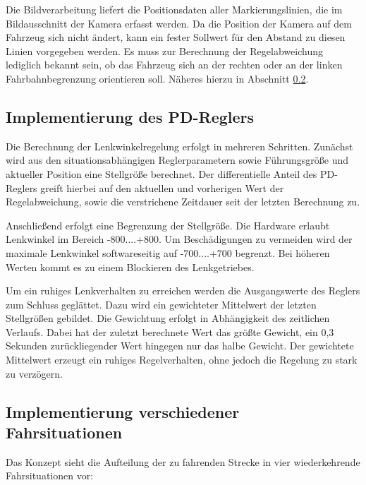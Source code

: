 Die Bildverarbeitung liefert die Positionsdaten aller Markierungslinien, die im Bildausschnitt der Kamera erfasst werden. Da die Position der Kamera auf dem Fahrzeug sich nicht ändert, kann ein fester Sollwert für den Abstand zu diesen Linien vorgegeben werden. Es muss zur Berechnung der Regelabweichung lediglich bekannt sein, ob das Fahrzeug sich an der rechten oder an der linken Fahrbahnbegrenzung orientieren soll. Näheres hierzu in Abschnitt \ref{sec:fahrsituationen}.


\subsection{Implementierung des PD-Reglers}
\label{sec:pdregler}

Die Berechnung der Lenkwinkelregelung erfolgt in mehreren Schritten. Zunächst wird aus den situationsabhängigen Reglerparametern sowie Führungsgröße und aktueller Position eine Stellgröße berechnet. Der differentielle Anteil des PD-Reglers greift hierbei auf den aktuellen und vorherigen Wert der Regelabweichung, sowie die verstrichene Zeitdauer seit der letzten Berechnung zu.


Anschließend erfolgt eine Begrenzung der Stellgröße. Die Hardware erlaubt Lenkwinkel im Bereich -800....+800. Um Beschädigungen zu vermeiden wird der maximale Lenkwinkel softwareseitig auf -700....+700 begrenzt. Bei höheren Werten kommt es zu einem Blockieren des Lenkgetriebes.

Um ein ruhiges Lenkverhalten zu erreichen werden die Ausgangswerte des Reglers zum Schluss geglättet. Dazu wird ein gewichteter Mittelwert der letzten Stellgrößen gebildet. Die Gewichtung erfolgt in Abhängigkeit des zeitlichen Verlaufs. Dabei hat der zuletzt berechnete Wert das größte Gewicht, ein 0,3 Sekunden zurückliegender Wert hingegen nur das halbe Gewicht. Der gewichtete Mittelwert erzeugt ein ruhiges Regelverhalten, ohne jedoch die Regelung zu stark zu verzögern.


\subsection{Implementierung verschiedener Fahrsituationen}
\label{sec:fahrsituationen}

Das Konzept sieht die Aufteilung der zu fahrenden Strecke in vier wiederkehrende Fahrsituationen vor:

